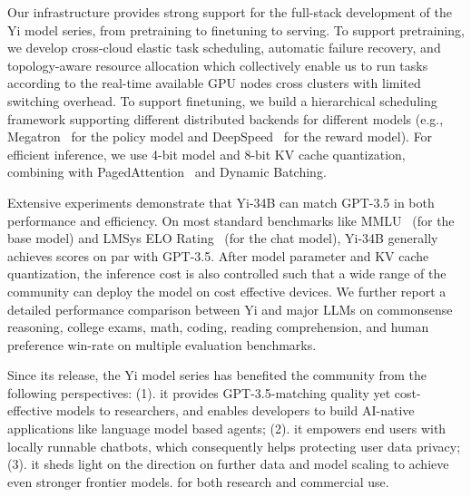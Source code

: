 Our infrastructure provides strong support for the full-stack development of the Yi model series, from pretraining to finetuning to serving. 
To support pretraining, we develop cross-cloud elastic task scheduling, automatic failure recovery, and topology-aware resource allocation which collectively enable us to run tasks according to the real-time available GPU nodes cross clusters with limited switching overhead. 
To support finetuning, we build a hierarchical scheduling framework supporting different distributed backends for different models (e.g., Megatron~\citep{megatron-lm} for the policy model and DeepSpeed~\citep{zero} for the reward model). 
For efficient inference, we use 4-bit model and 8-bit KV cache quantization, combining with PagedAttention~\citep{kwon2023efficient} and Dynamic Batching. 


Extensive experiments demonstrate that Yi-34B can match GPT-3.5 in both performance and efficiency. 
On most standard benchmarks like MMLU~\citep{hendrycks2020measuring} (for the base model) and LMSys ELO Rating~\citep{zheng2023judging} (for the chat model), Yi-34B generally achieves scores on par with GPT-3.5. 
After model parameter and KV cache quantization, the inference cost is also controlled such that a wide range of the community can deploy the model on cost effective devices. 
We further report a detailed performance comparison between Yi and major LLMs on commonsense reasoning, college exams, math, coding, reading comprehension, and human preference win-rate on multiple evaluation benchmarks. 


Since its release, the Yi model series has  benefited the community from the following perspectives: 
(1). it provides GPT-3.5-matching quality yet cost-effective models to researchers, and enables developers to build AI-native applications like language model based agents;
(2). it empowers end users with locally runnable chatbots, which consequently helps protecting user data privacy; 
(3). it sheds light on the direction on further data and model scaling to achieve even stronger frontier models. 
for both research and commercial use.

